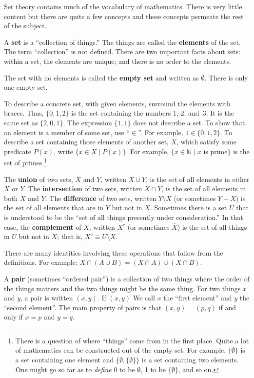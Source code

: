 \documentclass[10pt, a4paper, twocolumn]{article}
\newcommand{\defn}[1]{\textbf{#1}}
\begin{document}
Set theory contains much of the vocabulary of mathematics. There is very little
content but there are quite a few concepts and these concepts permeate the rest
of the subject.

A \defn{set} is a “collection of things.” The things are called the
\defn{elements} of the set. The term “collection” is not defined. There are two
important facts about sets: within a set, the elements are unique; and there is
no order to the elements.

The set with no elements is called the \defn{empty set} and written as
$\emptyset$. There is only one empty set.

To describe a concrete set, with given elements, surround the elements with
braces. Thus, $\{0, 1, 2\}$ is the set containing the numbers 1, 2, and~3. It is
the same set as $\{2,0,1\}$. The expression $\{1, 1\}$ does not describe a
set. To show that an element is a member of some set, use “$\in$”. For example,
$1\in\{0,1,2\}$. To describe a set containing those elements of another set, $X$,
which satisfy some predicate $P(x)$, write $\{x \in X \mid P(x)\}$. For example, $\{x
\in \mathbb{N} \mid \text{$x$ is prime}\}$ is the set of primes.\footnote{There is a
  question of where “things” come from in the first place. Quite a lot of
  mathematics can be constructed out of the empty set. For example, $\{\emptyset\}$ is a
  set containing one element and $\{\emptyset, \{\emptyset\}\}$ is a set containing two
  elements. One might go so far as to \emph{define} 0 to be $\emptyset$, 1 to be
  $\{\emptyset\}$, and so on.}

The \defn{union} of two sets, $X$ and $Y$, written $X \cup Y$, is the set of all
elements in either $X$ or $Y$. The \defn{intersection} of two sets, written $X \cap
Y$, is the set of all elements in both $X$ and $Y$. The \defn{difference} of two
sets, written $Y \setminus X$ (or sometimes $Y-X$) is the set of all elements that are
in $Y$ but not in $X$. Sometimes there is a set $U$ that is understood to be the
“set of all things presently under consideration.” In that case, the
\defn{complement} of $X$, written $X^c$ (or sometimes $\bar{X}$) is the set of
all things in $U$ but not in $X$; that is, $X^c \equiv U \setminus X$.

There are many identities involving these operations that follow from the
definitions. For example: $X\cap(A\cup B) = (X\cap A)\cup (X\cap B)$. 

A \defn{pair} (sometimes “ordered pair”) is a collection of two things where the
order of the things matters and the two things might be the same thing. For two
things $x$ and $y$, a pair is written $(x, y)$. If $(x, y)$ We call $x$ the
“first element” and $y$ the “second element”. The main property of pairs is that
$(x,y)=(p,q)$ if and only if $x=p$ and $y=q$.
\end{document}
